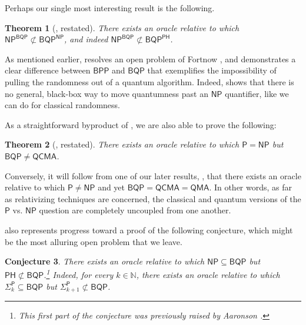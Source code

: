 \documentclass[10pt,a4paper]{article}
\newtheorem{theorem}{Theorem}
\newtheorem{conjecture}[theorem]{Conjecture}
\newcommand{\Naturals}{\mathbb{N}}
\begin{document}
Perhaps our single most interesting result is the following.

\begin{theorem}[, restated]
\label{thm:np^bqp_not_in_bqp^np_intro}
There exists an oracle relative to which $\mathsf{NP}^\mathsf{BQP} \not\subset \mathsf{BQP}^\mathsf{NP}$, and indeed $\mathsf{NP}^\mathsf{BQP} \not\subset \mathsf{BQP}^\mathsf{PH}$.
\end{theorem}

As mentioned earlier,  resolves an open problem of Fortnow \cite{For05}, and demonstrates a clear difference between $\mathsf{BPP}$ and $\mathsf{BQP}$ that exemplifies the impossibility of pulling the randomness out of a quantum algorithm. Indeed,  shows that there is no general, black-box way to move quantumness past an $\mathsf{NP}$ quantifier, like we can do for classical randomness.

As a straightforward byproduct of , we are also able to prove the following:

\begin{theorem}[, restated]
\label{thm:p=np_bqp!=qcma_intro}
There exists an oracle relative to which $\mathsf{P} = \mathsf{NP}$ but $\mathsf{BQP} \neq \mathsf{QCMA}$.
\end{theorem}

Conversely, it will follow from one of our later results, , that there exists an oracle relative to which $\mathsf{P} \neq \mathsf{NP}$ and yet $\mathsf{BQP} = \mathsf{QCMA} = \mathsf{QMA}$.  In other words, as far as relativizing techniques are concerned, the classical and quantum versions of the $\mathsf{P}$ vs. $\mathsf{NP}$ question are completely uncoupled from one another.

 also represents progress toward a proof of the following conjecture, which might be the most alluring open problem that we leave.

\begin{conjecture}
\label{conj:sigma_k_in_bqp_sigma_k+1_not}
There exists an oracle relative to which $\mathsf{NP} \subseteq \mathsf{BQP}$ but $\mathsf{PH} \not\subset \mathsf{BQP}$.\footnote{This first part of the conjecture was previously raised by Aaronson \cite{Aar10}.}  Indeed, for every $k \in \Naturals$, there exists an oracle relative to which $\mathsf{\Sigma}_k^\mathsf{P} \subseteq \mathsf{BQP}$ but $\mathsf{\Sigma}_{k+1}^\mathsf{P} \not\subset \mathsf{BQP}$.
\end{conjecture}
\end{document}
